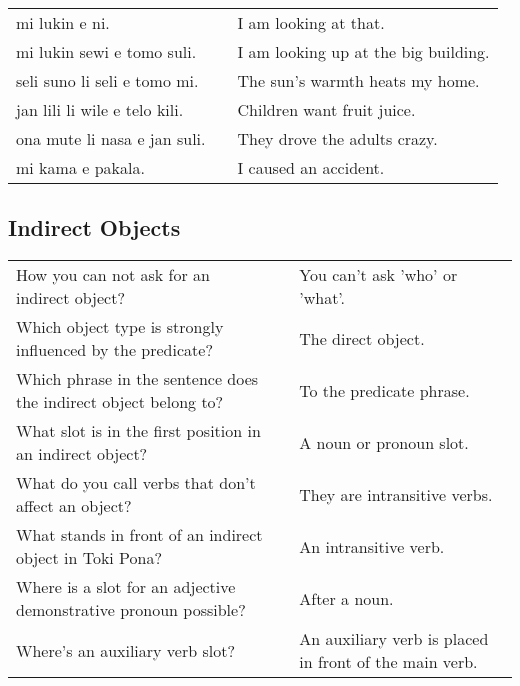 \begin{supertabular}{p{5,5cm}|ll}
    mi lukin e ni.                &  & I am looking at that.                \\
    mi lukin sewi e tomo suli.    &  & I am looking up at the big building. \\
    seli suno li seli e tomo mi.  &  & The sun's warmth heats my home.      \\
    jan lili li wile e telo kili. &  & Children want fruit juice.           \\
    ona mute li nasa e jan suli.  &  & They drove the adults crazy.         \\
    mi kama e pakala.             &  & I caused an accident.                \\
\end{supertabular}

\newpage

\subsection*{Indirect Objects}
\label{'indirect_objects'}

\begin{supertabular}{p{5,5cm}|ll}
    How you can not ask for an indirect object?                      &  & You can't ask 'who' or 'what'.                         \\
    Which object type is strongly influenced by the predicate?       &  & The direct object.                                     \\
    Which phrase in the sentence does the indirect object belong to? &  & To the predicate phrase.                               \\
    What slot is in the first position in an indirect object?        &  & A noun or pronoun slot.                                \\
    What do you call verbs that don't affect an object?              &  & They are intransitive verbs.                           \\
    What stands in front of an indirect object in Toki Pona?         &  & An intransitive verb.                                  \\
    Where is a slot for an adjective demonstrative pronoun possible? &  & After a noun.                                          \\
    Where's an auxiliary verb slot?                                  &  & An auxiliary verb is placed in front of the main verb. \\
\end{supertabular}

